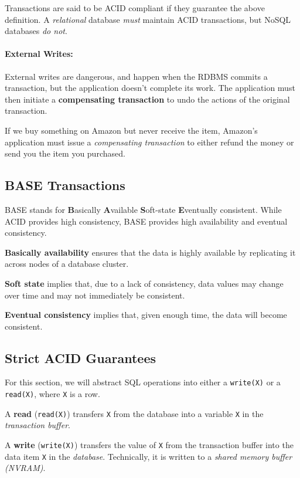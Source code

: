 \documentclass{report}
\newenvironment{definition}[1]{\begin{tcolorbox}[title={Definition: #1}]}{\end{tcolorbox}}
\newenvironment{example}{\begin{tcolorbox}[title={Example},colback=green!5!white,colframe=black!75!green]}{\end{tcolorbox}}
\renewcommand{\bf}[1]{\textbf{{#1}}}
\renewcommand{\tt}[1]{\texttt{{#1}}}
\renewcommand{\it}[1]{\textit{{#1}}}
\begin{document}
Transactions are said to be ACID compliant if they guarantee the above
definition. A \it{relational} database \it{must} maintain ACID transactions, but
NoSQL databases \it{do not}.

\paragraph{External Writes:} External writes are dangerous, and happen when the
RDBMS commits a transaction, but the application doesn't complete its work. The
application must then initiate a \bf{compensating transaction} to undo the
actions of the original transaction.

\begin{example}
    If we buy something on Amazon but never receive the item, Amazon's
    application must issue a \it{compensating transaction} to either refund the
    money or send you the item you purchased.
\end{example}

\subsection{BASE Transactions}
BASE stands for \bf{B}asically \bf{A}vailable \bf{S}oft-state \bf{E}ventually
consistent. While ACID provides high consistency, BASE provides high
availability and eventual consistency.
\begin{definition}{Basically Available}
    \bf{Basically availability} ensures that the data is highly available by
    replicating it across nodes of a database cluster.
\end{definition}

\begin{definition}{Soft State}
    \bf{Soft state} implies that, due to a lack of consistency, data values may
    change over time and may not immediately be consistent.
\end{definition}

\begin{definition}{Eventually Consistent}
    \bf{Eventual consistency} implies that, given enough time, the data will become
    consistent.
\end{definition}

\subsection{Strict ACID Guarantees}
For this section, we will abstract SQL operations into either a \tt{write(X)} or
a \tt{read(X)}, where \tt{X} is a row.
\begin{definition}{Read and Write}
    A \bf{read} (\tt{read(X)}) transfers \tt{X} from the database into a
    variable \tt{X} in the \it{transaction buffer}.
    \vspace{1em}

    A \bf{write} (\tt{write(X)}) transfers the value of \tt{X} from the
    transaction buffer into the data item \tt{X} in the \it{database}.
    Technically, it is written to a \it{shared memory buffer (NVRAM)}.
\end{definition}
\end{document}
